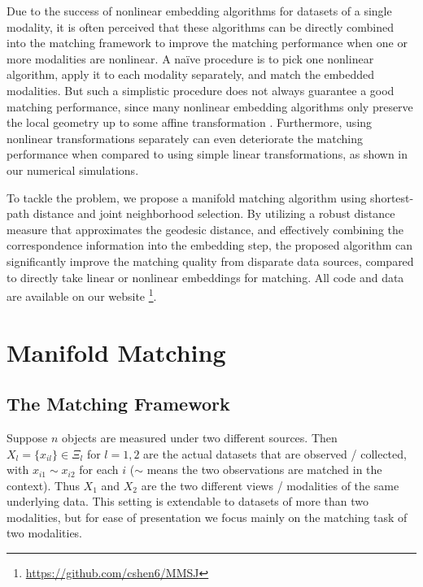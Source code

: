 \documentclass[times,twocolumn,final]{elsarticle}
\begin{document}
Due to the success of nonlinear embedding algorithms for datasets of a single modality, it is often perceived that these algorithms can be directly combined into the matching framework to improve the matching performance when one or more modalities are nonlinear. A na\"ive procedure is to pick one nonlinear algorithm, apply it to each modality separately, and match the embedded modalities. But such a simplistic procedure does not always guarantee a good matching performance, since many nonlinear embedding algorithms only preserve the local geometry up to some affine transformation \citep{GoldbergRitov2008}. Furthermore, using nonlinear transformations separately can even deteriorate the matching performance when compared to using simple linear transformations, as shown in our numerical simulations.

To tackle the problem, we propose a manifold matching algorithm using shortest-path distance and joint neighborhood selection. By utilizing a robust distance measure that approximates the geodesic distance, and effectively combining the correspondence information into the embedding step, the proposed algorithm can significantly improve the matching quality from disparate data sources, compared to directly take linear or nonlinear embeddings for matching. All code and data are available on our website \footnote{\url{https://github.com/cshen6/MMSJ}}.

\section{Manifold Matching}
\label{main}

\subsection{The Matching Framework}
\label{bg}
Suppose $n$ objects are measured under two different sources. Then $X_{l}=\{x_{il}\} \in \Xi_{l}$ for $l=1, 2$ are the actual datasets that are observed / collected, with $x_{i1} \sim x_{i2}$ for each $i$ ($\sim$ means the two observations are matched in the context). Thus $X_{1}$ and $X_{2}$ are the two different views / modalities of the same underlying data. This setting is extendable to datasets of more than two modalities, but for ease of presentation we focus mainly on the matching task of two modalities.
\end{document}

